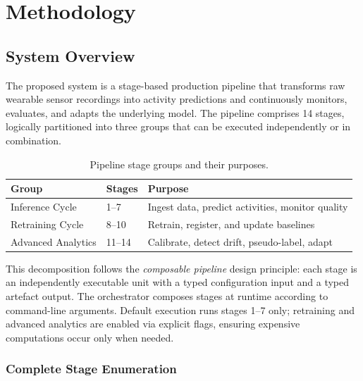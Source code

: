 \chapter{Methodology}
\label{ch:methodology}

\section{System Overview}
\label{sec:system_overview}

The proposed system is a stage-based production pipeline that transforms raw
wearable sensor recordings into activity predictions and continuously monitors,
evaluates, and adapts the underlying model.
The pipeline comprises 14 stages, logically partitioned into three groups that
can be executed independently or in combination.

\begin{table}[ht]
  \centering
  \caption{Pipeline stage groups and their purposes.}
  \label{tab:stage_groups}
  \begin{tabularx}{\linewidth}{llX}
    \toprule
    \textbf{Group} & \textbf{Stages} & \textbf{Purpose} \\
    \midrule
    Inference Cycle     & 1--7   & Ingest data, predict activities, monitor quality \\
    Retraining Cycle    & 8--10  & Retrain, register, and update baselines \\
    Advanced Analytics  & 11--14 & Calibrate, detect drift, pseudo-label, adapt \\
    \bottomrule
  \end{tabularx}
\end{table}

This decomposition follows the \textit{composable pipeline} design principle:
each stage is an independently executable unit with a typed configuration input
and a typed artefact output.
The orchestrator composes stages at runtime according to command-line arguments.
Default execution runs stages 1--7 only; retraining and advanced analytics are
enabled via explicit flags, ensuring expensive computations occur only when needed.

\subsection{Complete Stage Enumeration}

